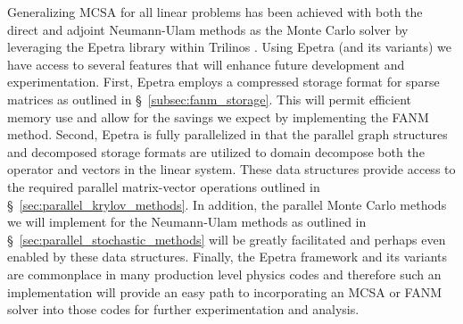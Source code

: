 Generalizing MCSA for all linear problems has been achieved with both
the direct and adjoint Neumann-Ulam methods as the Monte Carlo solver
by leveraging the Epetra library within Trilinos
\citep{heroux_overview_2005}. Using Epetra (and its variants) we have
access to several features that will enhance future development and
experimentation. First, Epetra employs a compressed storage format for
sparse matrices as outlined in \S~\ref{subsec:fanm_storage}. This will
permit efficient memory use and allow for the savings we expect by
implementing the FANM method. Second, Epetra is fully parallelized in
that the parallel graph structures and decomposed storage formats are
utilized to domain decompose both the operator and vectors in the
linear system. These data structures provide access to the required
parallel matrix-vector operations outlined in
\S~\ref{sec:parallel_krylov_methods}. In addition, the parallel Monte
Carlo methods we will implement for the Neumann-Ulam methods as
outlined in \S~\ref{sec:parallel_stochastic_methods} will be greatly
facilitated and perhaps even enabled by these data
structures. Finally, the Epetra framework and its variants are
commonplace in many production level physics codes and therefore such
an implementation will provide an easy path to incorporating an MCSA
or FANM solver into those codes for further experimentation and
analysis.

